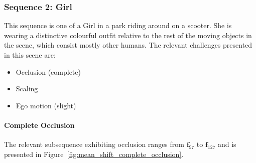 \subsubsection{Sequence 2: Girl}
This sequence is one of a Girl in a park riding around on a scooter. She is
wearing a distinctive colourful outfit relative to the rest of the moving objects in the
scene, which consist mostly other humans.
The relevant challenges presented in this scene are:
\begin{itemize}
    \item Occlusion (complete)
    \item Scaling 
    \item Ego motion (slight) 
\end{itemize}

\paragraph{Complete Occlusion}
The relevant subsequence exhibiting occlusion ranges from $\mathbf{f}_{97}$ to
$\mathbf{f}_{127}$ and is presented in Figure~\ref{fig:mean_shift_complete_occlusion}.

